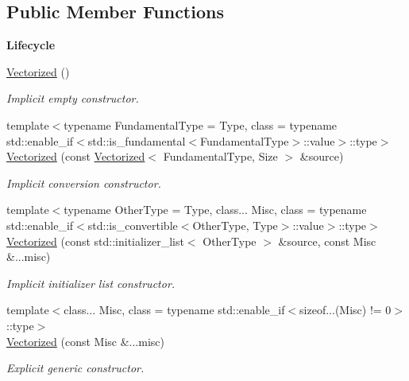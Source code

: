 \subsection*{Public Member Functions}
\begin{Indent}{\bf Lifecycle}\par
\begin{DoxyCompactItemize}
\item 
\hyperlink{exceptionmagrathea_1_1Vectorized_ac54dac541b6b47cb6453a1de0b3dc575}{Vectorized} ()
\begin{DoxyCompactList}\small\item\em Implicit empty constructor. \end{DoxyCompactList}\item 
{\footnotesize template$<$typename Fundamental\-Type  = Type, class  = typename std\-::enable\-\_\-if$<$std\-::is\-\_\-fundamental$<$\-Fundamental\-Type$>$\-::value$>$\-::type$>$ }\\\hyperlink{exceptionmagrathea_1_1Vectorized_a19336c66bd5a1c9177a50be159eceae3}{Vectorized} (const \hyperlink{exceptionmagrathea_1_1Vectorized}{Vectorized}$<$ Fundamental\-Type, Size $>$ \&source)
\begin{DoxyCompactList}\small\item\em Implicit conversion constructor. \end{DoxyCompactList}\item 
{\footnotesize template$<$typename Other\-Type  = Type, class... Misc, class  = typename std\-::enable\-\_\-if$<$std\-::is\-\_\-convertible$<$\-Other\-Type, Type$>$\-::value$>$\-::type$>$ }\\\hyperlink{exceptionmagrathea_1_1Vectorized_a8dd5b14cd9f879ad5472ba3f87e4f1d9}{Vectorized} (const std\-::initializer\-\_\-list$<$ Other\-Type $>$ \&source, const Misc \&...misc)
\begin{DoxyCompactList}\small\item\em Implicit initializer list constructor. \end{DoxyCompactList}\item 
{\footnotesize template$<$class... Misc, class  = typename std\-::enable\-\_\-if$<$sizeof...(\-Misc) != 0$>$\-::type$>$ }\\\hyperlink{exceptionmagrathea_1_1Vectorized_a5143d9865051881aa79740df5c728f9e}{Vectorized} (const Misc \&...misc)
\begin{DoxyCompactList}\small\item\em Explicit generic constructor. \end{DoxyCompactList}\end{DoxyCompactItemize}
\end{Indent}
